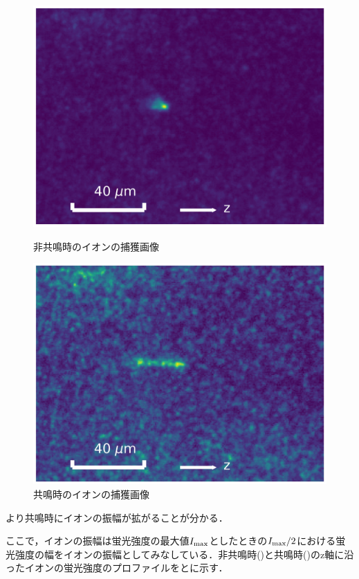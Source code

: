 \begin{figure}[h]
		\begin{minipage}{0.48\linewidth}
			\centering
			\includegraphics[width = 0.6\columnwidth]{./methods/figure/off_resonance.jpg}
			\caption{非共鳴時のイオンの捕獲画像}
			\label{fig:example_off_resonance}
		\end{minipage}
		\begin{minipage}{0.48\linewidth}
			\centering
			\includegraphics[width = 0.6\columnwidth]{./methods/figure/resonance.jpg}
			\caption{共鳴時のイオンの捕獲画像}
			\label{fig:example_resonance}
		\end{minipage}
\end{figure}

より共鳴時にイオンの振幅が拡がることが分かる．

\clearpage

ここで，イオンの振幅は蛍光強度の最大値$I_{\rm max}$としたときの$I_{\rm max}/2$における蛍光強度の幅をイオンの振幅としてみなしている．非共鳴時()と共鳴時()のz軸に沿ったイオンの蛍光強度のプロファイルをとに示す．

